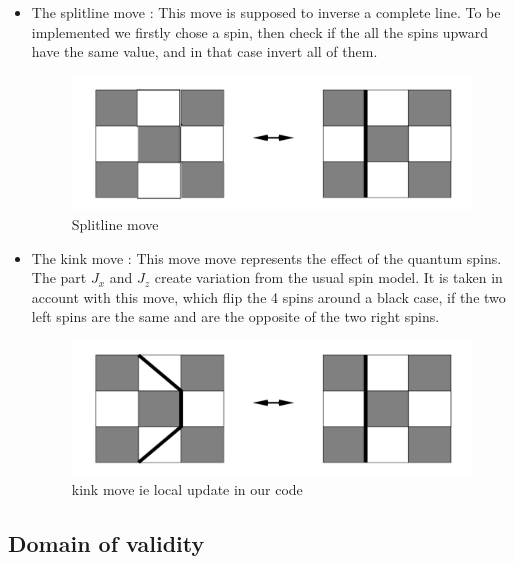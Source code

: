 \documentclass[a4paper,12pt]{article}
\begin{document}
	 \begin{itemize}[label=$\star$]
	 	\item{The splitline move :} This move is supposed to inverse a complete line. To be implemented we firstly chose a spin, then check if the all the spins upward have the same value, and in that case invert all of them.
	 		\begin{figure}[!h]
	 		\centering
	 		\includegraphics[scale=0.4]{splitline.png}
	 		\caption{Splitline move}

	 	    \end{figure}
	 	
	 	\item{The kink move :} This move move represents the effect of the quantum spins. The part $J_x$ and $J_z$ create variation from the usual spin model. It is taken in account with this move, which flip the 4 spins around a black case, if the two left spins are the same and are the opposite of the two right spins.
	 	\begin{figure}[H]
	 		\centering
	 		\includegraphics[scale=0.4]{kink.png}
	 		\caption{kink move ie local update in our code}
	 		
	 	\end{figure}
	 	
	 \end{itemize}
		 	
		 	
		 	
 	\subsection{Domain of validity}
\end{document}
